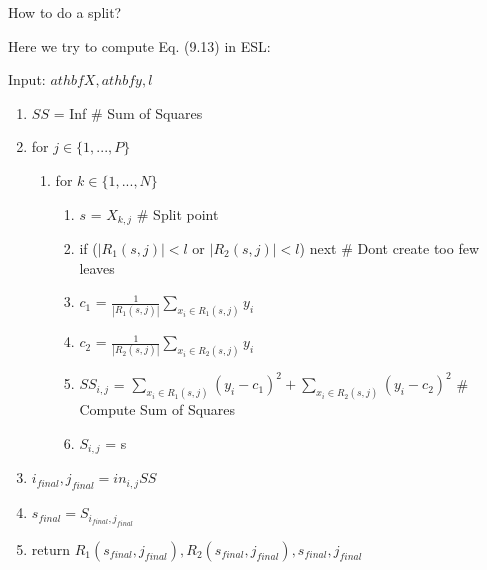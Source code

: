 \documentclass[11pt,aspectratio=1610,usenames,dvipsnames]{beamer} %
\begin{document}
\begin{frame}{How to do a split?}
	
	Here we try to compute Eq. (9.13) in ESL:
	
	Input: $athbf{X}, athbf{y}, l$
	
	\begin{enumerate}
		\item[] $SS$ = Inf \# Sum of Squares
		\item[] for $j \in \{1,...,P\}$
		\begin{enumerate}
			\item[] for $k \in \{1,...,N\}$
			\begin{enumerate}
				\item[] $s$ = $X_{k,j}$ \# Split point
				\item[] if ($|R_1(s, j)| < l$ or $|R_2(s, j)| < l$) next \# Dont create too few leaves
				\item[] $c_1$ = $\frac{1}{|R_1(s, j)|} \sum_{x_i \in R_1(s, j)} y_i$
				\item[] $c_2$ = $\frac{1}{|R_2(s, j)|} \sum_{x_i \in R_2(s, j)} y_i$
				\item[] $SS_{i,j}$ = $\sum_{x_i \in R_1(s, j)} (y_i - c_1)^2 + \sum_{x_i \in R_2(s, j)} (y_i - c_2)^2$ \# Compute Sum of Squares
				\item[] $S_{i,j}$ = s
			\end{enumerate}
		\end{enumerate}
		\item[] $i_{final}, j_{final} = in_{i,j} SS$
		\item[] $s_{final} = S_{i_{final},j_{final}}$
		\item[] return $R_1(s_{final}, j_{final}), R_2(s_{final}, j_{final}), s_{final}, j_{final}$
	\end{enumerate}
\end{frame}
\end{document}

